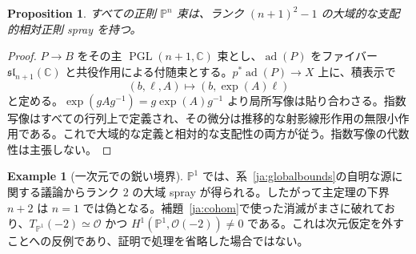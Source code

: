\documentclass[12pt]{amsart}
\newtheorem{prop}[thm]{Proposition}
\theoremstyle{definition}
\newtheorem{eg}[thm]{Example}
\theoremstyle{remark}
\numberwithin{equation}{section}
\newcommand{\cO}{\mathcal{O}}
\newcommand{\C}{\mathbb{C}}
\newcommand{\mP}{\mathbb{P}}
\DeclareMathOperator{\PG}{PGL}
\begin{document}
\begin{prop}\label{ja:relativeexistence}
すべての正則 $\mP^n$ 束は、ランク $(n+1)^2-1$ の大域的な支配的相対正則 spray を持つ。
\end{prop}
\begin{proof}
$P\to B$ をその主 $\PG(n+1,\C)$ 束とし、$\operatorname{ad}(P)$ をファイバー $\mathfrak{sl}_{n+1}(\C)$ と共役作用による付随束とする。$p^*\operatorname{ad}(P)\to X$ 上に、積表示で
\[
(b,\ell,A)\longmapsto (b,\exp(A)\ell)
\]
と定める。$\exp(gAg^{-1})=g\exp(A)g^{-1}$ より局所写像は貼り合わさる。指数写像はすべての行列上で定義され、その微分は推移的な射影線形作用の無限小作用である。これで大域的な定義と相対的な支配性の両方が従う。指数写像の代数性は主張しない。
\end{proof}

\begin{eg}[一次元での鋭い境界]\label{ja:pone}
$\mP^1$ では、系~\ref{ja:globalbounds}の自明な源に関する議論からランク $2$ の大域 spray が得られる。したがって主定理の下界 $n+2$ は $n=1$ では偽となる。補題~\ref{ja:cohom}で使った消滅がまさに破れており、$T_{\mP^1}(-2)\simeq\cO$ かつ $H^1(\mP^1,\cO(-2))\ne0$ である。これは次元仮定を外すことへの反例であり、証明で処理を省略した場合ではない。
\end{eg}
\end{document}
